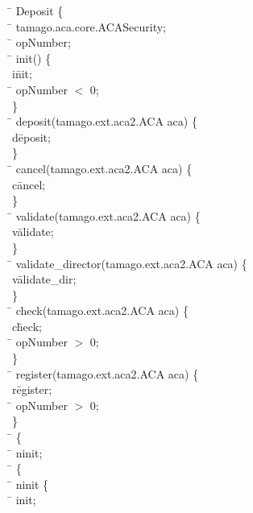 \begin{program}
\=   Deposit \{\\
\>  \=    tamago.aca.core.ACASecurity;\\
\>  \=       opNumber;\\
\>  \=     init() \{\\
\>  \>   i\= nit;\\
\>  \>  \=   opNumber $<$ 0;\\
\>  \}\\
\>  \=     deposit(tamago.ext.aca2.ACA aca) \{\\
\>  \>   d\= eposit;\\
\>  \}\\
\>  \=     cancel(tamago.ext.aca2.ACA aca) \{\\
\>  \>   c\= ancel;\\
\>  \}\\
\>  \=     validate(tamago.ext.aca2.ACA aca) \{\\
\>  \>   v\= alidate;\\
\>  \}\\
\>  \=     validate_director(tamago.ext.aca2.ACA aca) \{\\
\>  \>   v\= alidate_dir;\\
\>  \}\\
\>  \=     check(tamago.ext.aca2.ACA aca) \{\\
\>  \>   c\= heck;\\
\>  \>  \=   opNumber $>$ 0;\\
\>  \}\\
\>  \=     register(tamago.ext.aca2.ACA aca) \{\\
\>  \>   r\= egister;\\
\>  \>  \=   opNumber $>$ 0;\\
\>  \}\\
\>  \=   \{\\
\>  \>  \=    ninit;\\
\>  \>  \=   \{\\
\>  \>  \>  \=   ninit \{\\
\>  \>  \>  \>  \=    init;\\

\end{program}
